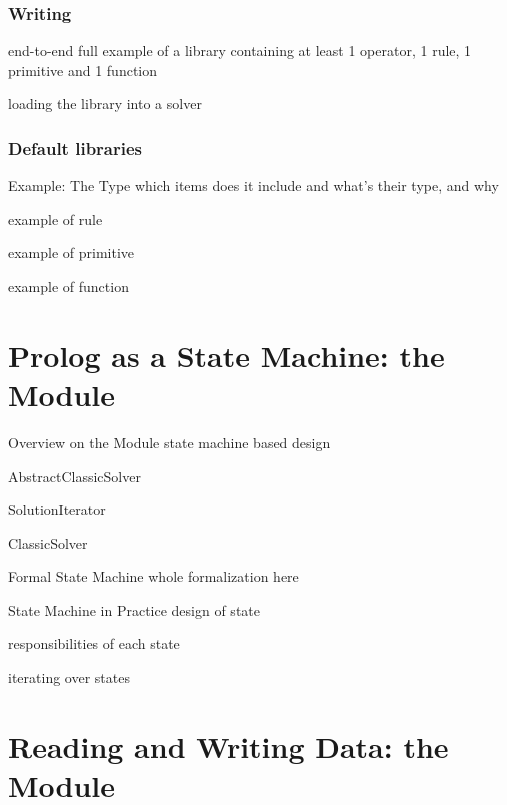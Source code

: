 \documentclass[handout]{beamer}
\begin{document}
\subsubsection{Writing }

\begin{frame}[allowframebreaks]{ end-to-end}
    full example of a library containing at least 1 operator, 1 rule, 1 primitive and 1 function

    loading the library into a solver
 \end{frame}

\subsubsection{Default libraries}

\begin{frame}[allowframebreaks]{Example: The  Type}
    which items does it include and what's their type, and why

    example of rule

    example of primitive

    example of function
\end{frame}

\section{Prolog as a State Machine: the  Module}

\begin{frame}[allowframebreaks]{Overview on the  Module}
    state machine based design

    AbstractClassicSolver

    SolutionIterator

    ClassicSolver
\end{frame}

\begin{frame}[allowframebreaks]{Formal State Machine}
    whole formalization here
\end{frame}

\begin{frame}[allowframebreaks]{State Machine in Practice}
    design of state

    responsibilities of each state

    iterating over states
\end{frame}

\section{Reading and Writing Data: the  Module}
\end{document}
